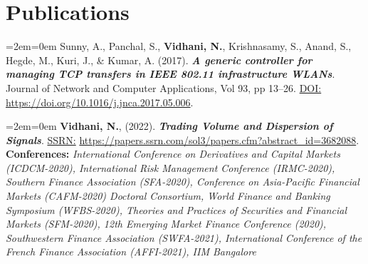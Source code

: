 \documentclass[11pt,a4paper,]{moderncv}
\begin{document}
\nopagebreak

\hypertarget{publications}{%
\section{Publications}\label{publications}}

\begingroup
\setlength{\parindent}{-0.5in}
\setlength{\leftskip}{0.5in}

\bgroup %
  \par%
  \medskip
  \leftskip=2em\rightskip=0em%
  \noindent\ignorespaces
Sunny, A., Panchal, S., \textbf{Vidhani, N.}, Krishnasamy, S., Anand, S., Hegde, M., Kuri, J., \& Kumar, A. (2017).
\textbf{\textit{A generic controller for managing TCP transfers in IEEE 802.11 infrastructure WLANs}}. Journal of Network and Computer Applications, Vol 93, pp 13--26. \underline{DOI:} \url{https://doi.org/10.1016/j.jnca.2017.05.006}.\\
%
  \par\medskip\egroup

\bgroup %
  \par%
  \medskip
  \leftskip=2em\rightskip=0em%
  \noindent\ignorespaces
\textbf{Vidhani, N.}, (2022). \textbf{\textit{Trading Volume and Dispersion of Signals}}. \underline{SSRN:} \url{https://papers.ssrn.com/sol3/papers.cfm?abstract_id=3682088}.\\
\textbf{Conferences:} \textit{International Conference on Derivatives and Capital Markets (ICDCM-2020), International Risk Management Conference (IRMC-2020), Southern Finance Association (SFA-2020), Conference on Asia-Pacific Financial Markets (CAFM-2020) Doctoral Consortium, World Finance and Banking Symposium (WFBS-2020), Theories and Practices of Securities and Financial Markets (SFM-2020), 12th Emerging Market Finance Conference (2020), Southwestern Finance Association (SWFA-2021), International Conference of the French Finance Association (AFFI-2021), IIM Bangalore}\\
%
  \par\medskip\egroup
\end{document}
